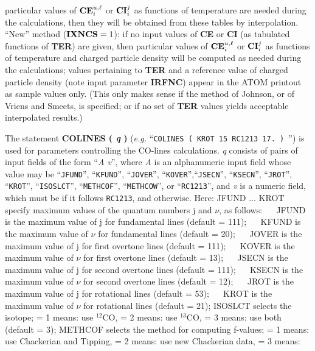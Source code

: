 particular values of ${\bf CE}^{u,\ell}_i$ or ${\bf CI}^j_i$ as functions of
temperature are needed during the calculations, then they will be obtained from
these tables by interpolation. \np
``New'' method (${\bf IXNCS} = 1$): if no input values of {\bf CE} or {\bf CI}
(as tabulated functions of {\bf TER}) are given, then particular values of
${\bf CE}^{u,\ell}_i$ or ${\bf CI}^j_i$ as functions of temperature and charged
particle density will be computed as needed during the calculations; values
pertaining to {\bf TER} and a reference value of charged particle density (note
input parameter {\bf IRFNC}) appear in the ATOM printout as sample values only.
(This only makes sense if the method of Johnson, or of Vriens and Smeets, is
specified; or if no set of {\bf TER} values yields acceptable interpolated
results.)
\ej
\centerline{}
\space \noindent
The statement {\bf COLINES ( {\it q} )} 
({\it e.g.} ``{\tt COLINES ( KROT 15 RC1213 17. ) }'') \break is used for
parameters controlling the CO-lines calculations. {\it q} consists of
pairs of input fields of the form ``{\it A v}'', where {\it A} is an
alphanumeric input field whose value may be ``{\tt JFUND}'', ``{\tt KFUND}'',
``{\tt JOVER}'', ``{\tt KOVER}'',``{\tt JSECN}'', ``{\tt KSECN}'',
``{\tt JROT}'', ``{\tt KROT}'', ``{\tt ISOSLCT}'', ``{\tt METHCOF}'',
``{\tt METHCOW}'', or ``{\tt RC1213}'', and {\it v} is a numeric field,
which must be {\flpt} if it follows {\tt RC1213}, and {\intg} otherwise.
Here: \np
JFUND $\ldots$ KROT specify maximum values of the quantum numbers j and
$\nu$, as follows: \np
$\quad$ JFUND is the maximum value of j for fundamental lines (default = 111); \np
$\quad$ KFUND is the maximum value of $\nu$ for fundamental lines (default = 20); \np
$\quad$ JOVER is the maximum value of j for first overtone lines (default = 111); \np
$\quad$ KOVER is the maximum value of $\nu$ for first overtone lines (default = 13); \np
$\quad$ JSECN is the maximum value of j for second overtone lines (default = 111); \np
$\quad$ KSECN is the maximum value of $\nu$ for second overtone lines (default = 12); \np
$\quad$ JROT is the maximum value of j for rotational lines (default = 53); \np
$\quad$ KROT is the maximum value of $\nu$ for rotational lines (default = 21); \np
ISOSLCT selects the isotope; = 1 means: use $^{12}$CO,
= 2 means: use $^{13}$CO, \break = 3 means: use both (default = 3); \np
METHCOF selects the method for computing f-values; \break = 1 means: use
Chackerian and Tipping, = 2 means: use new Chackerian data, \break = 3 means:
